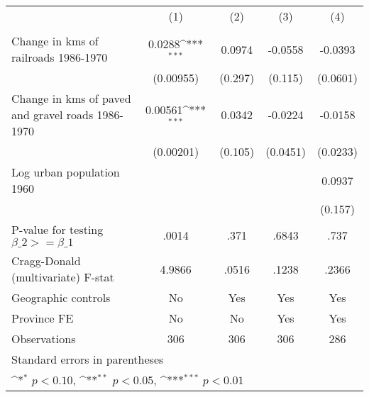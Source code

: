 {
\def\sym#1{\ifmmode^{#1}\else\(^{#1}\)\fi}
\begin{tabular}{l*{4}{c}}
\hline\hline
                &\multicolumn{1}{c}{(1)}&\multicolumn{1}{c}{(2)}&\multicolumn{1}{c}{(3)}&\multicolumn{1}{c}{(4)}\\
                &\multicolumn{1}{c}{}&\multicolumn{1}{c}{}&\multicolumn{1}{c}{}&\multicolumn{1}{c}{}\\
\hline
Change in kms of railroads 1986-1970&   0.0288\sym{***}&   0.0974         &  -0.0558         &  -0.0393         \\
                &(0.00955)         &  (0.297)         &  (0.115)         & (0.0601)         \\
[1em]
Change in kms of paved and gravel roads 1986-1970&  0.00561\sym{***}&   0.0342         &  -0.0224         &  -0.0158         \\
                &(0.00201)         &  (0.105)         & (0.0451)         & (0.0233)         \\
[1em]
Log urban population 1960&                  &                  &                  &   0.0937         \\
                &                  &                  &                  &  (0.157)         \\
\hline
P-value for testing $\beta\_{2} >= \beta\_{1}$&    .0014         &     .371         &    .6843         &     .737         \\
Cragg-Donald (multivariate) F-stat&   4.9866         &    .0516         &    .1238         &    .2366         \\
Geographic controls&       No         &      Yes         &      Yes         &      Yes         \\
Province FE     &       No         &       No         &      Yes         &      Yes         \\
Observations    &      306         &      306         &      306         &      286         \\
\hline\hline
\multicolumn{5}{l}{\footnotesize Standard errors in parentheses}\\
\multicolumn{5}{l}{\footnotesize \sym{*} \(p<0.10\), \sym{**} \(p<0.05\), \sym{***} \(p<0.01\)}\\
\end{tabular}
}
